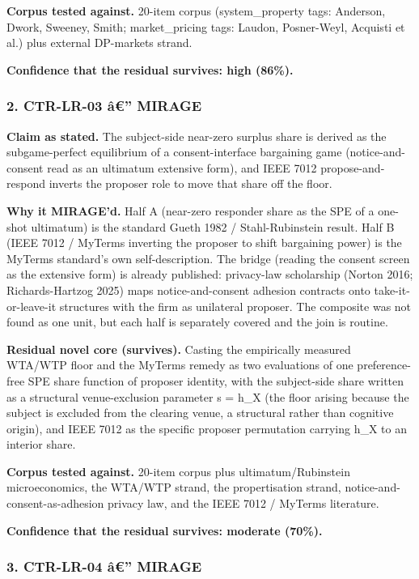 \documentclass[
  11pt,
]{article}
\begin{document}
\textbf{Corpus tested against.} 20-item corpus (system\_property tags:
Anderson, Dwork, Sweeney, Smith; market\_pricing tags: Laudon,
Posner-Weyl, Acquisti et al.) plus external DP-markets strand.

\textbf{Confidence that the residual survives: high (86\%).}

\subsubsection{2. CTR-LR-03 â€'' MIRAGE}\label{ctr-lr-03-uxe2-mirage}

\textbf{Claim as stated.} The subject-side near-zero surplus share is
derived as the subgame-perfect equilibrium of a consent-interface
bargaining game (notice-and-consent read as an ultimatum extensive
form), and IEEE 7012 propose-and-respond inverts the proposer role to
move that share off the floor.

\textbf{Why it MIRAGE'd.} Half A (near-zero responder share as the SPE
of a one-shot ultimatum) is the standard Gueth 1982 / Stahl-Rubinstein
result. Half B (IEEE 7012 / MyTerms inverting the proposer to shift
bargaining power) is the MyTerms standard's own self-description. The
bridge (reading the consent screen as the extensive form) is already
published: privacy-law scholarship (Norton 2016; Richards-Hartzog 2025)
maps notice-and-consent adhesion contracts onto take-it-or-leave-it
structures with the firm as unilateral proposer. The composite was not
found as one unit, but each half is separately covered and the join is
routine.

\textbf{Residual novel core (survives).} Casting the empirically
measured WTA/WTP floor and the MyTerms remedy as two evaluations of one
preference-free SPE share function of proposer identity, with the
subject-side share written as a structural venue-exclusion parameter s =
h\_X (the floor arising because the subject is excluded from the
clearing venue, a structural rather than cognitive origin), and IEEE
7012 as the specific proposer permutation carrying h\_X to an interior
share.

\textbf{Corpus tested against.} 20-item corpus plus ultimatum/Rubinstein
microeconomics, the WTA/WTP strand, the propertisation strand,
notice-and-consent-as-adhesion privacy law, and the IEEE 7012 / MyTerms
literature.

\textbf{Confidence that the residual survives: moderate (70\%).}

\subsubsection{3. CTR-LR-04 â€'' MIRAGE}\label{ctr-lr-04-uxe2-mirage}
\end{document}
